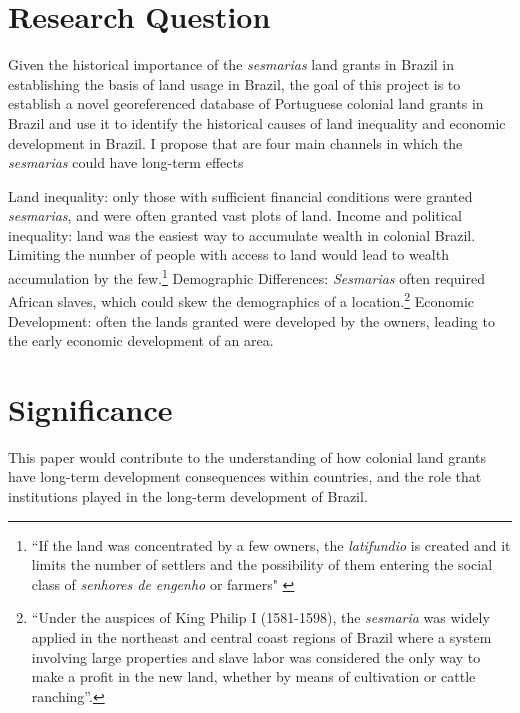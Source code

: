 \documentclass{article}
\begin{document}
\section{Research Question}

Given the historical importance of the \textit{sesmarias} land grants in Brazil in establishing the basis of land usage in Brazil, the goal of this project is to establish a novel georeferenced database of Portuguese colonial land grants in Brazil and use it to identify the historical causes of land inequality and economic development in Brazil. I propose that are four main channels in which the \textit{sesmarias} could have long-term effects 

\begin{outline}
  \1 Land inequality: only those with sufficient financial conditions were granted \textit{sesmarias}, and were often granted vast plots of land.
  \1 Income and political inequality: land was the easiest way to accumulate wealth in colonial Brazil. Limiting the number of people with access to land would lead to wealth accumulation by the few.\footnote{``If the land was concentrated by a few owners, the \textit{latifundio} is created and it limits the number of settlers and the possibility of them entering the social class of \textit{senhores de engenho} or farmers" \parencite[p.~40]{Bandecchi1963-uj}}
  \1 Demographic Differences: \textit{Sesmarias} often required African slaves, which could skew the demographics of a location.\footnote{``Under the auspices of King Philip I (1581-1598), the \textit{sesmaria} was widely applied in the northeast and central coast regions of Brazil where a system involving large properties and slave labor was considered the only way to make a profit in the new land, whether by means of cultivation or cattle ranching''\parencite{Lobb1976-mc}.}
  \1 Economic Development: often the lands granted were developed by the owners, leading to the early economic development of an area.
\end{outline}

\section{Significance}

This paper would contribute to the understanding of how colonial land grants have long-term development consequences within countries, and the role that institutions played in the long-term development of Brazil.  
\end{document}
